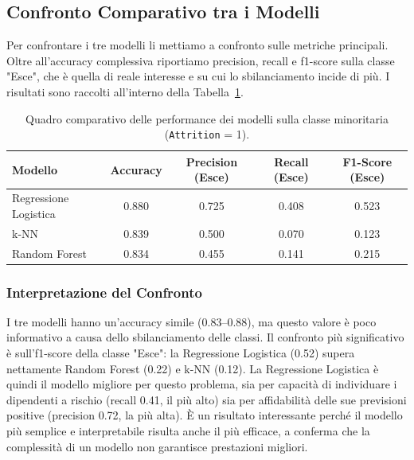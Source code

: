 \documentclass[11pt,a4paper]{article}
\begin{document}
\subsection{Confronto Comparativo tra i Modelli}

Per confrontare i tre modelli li mettiamo a confronto sulle metriche principali. Oltre all'accuracy complessiva riportiamo precision, recall e f1-score sulla classe "Esce", che è quella di reale interesse e su cui lo sbilanciamento incide di più. I risultati sono raccolti all'interno della Tabella~\ref{tab:confronto_modelli}.

\begin{table}[H]
\centering
\caption{Quadro comparativo delle performance dei modelli sulla classe minoritaria (\texttt{Attrition} = 1).}
\label{tab:confronto_modelli}
\begin{tabularx}{\textwidth}{Xcccc}
\toprule
\textbf{Modello} & \textbf{Accuracy} & \textbf{Precision (Esce)} & \textbf{Recall (Esce)} & \textbf{F1-Score (Esce)} \\ 
\midrule
Regressione Logistica & 0.880 & 0.725 & 0.408 & 0.523 \\ 
k-NN                  & 0.839 & 0.500 & 0.070 & 0.123 \\ 
Random Forest         & 0.834 & 0.455 & 0.141 & 0.215 \\ 
\bottomrule
\end{tabularx}
\end{table}

\subsubsection{Interpretazione del Confronto}
I tre modelli hanno un'accuracy simile (0.83–0.88), ma questo valore è poco informativo a causa dello sbilanciamento delle classi. Il confronto più significativo è sull'f1-score della classe "Esce": la Regressione Logistica (0.52) supera nettamente Random Forest (0.22) e k-NN (0.12). La Regressione Logistica è quindi il modello migliore per questo problema, sia per capacità di individuare i dipendenti a rischio (recall 0.41, il più alto) sia per affidabilità delle sue previsioni positive (precision 0.72, la più alta). È un risultato interessante perché il modello più semplice e interpretabile risulta anche il più efficace, a conferma che la complessità di un modello non garantisce prestazioni migliori.
\end{document}
